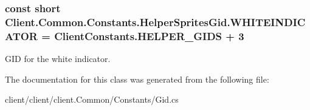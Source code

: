 \subsubsection[{W\+H\+I\+T\+E\+I\+N\+D\+I\+C\+A\+T\+O\+R}]{\setlength{\rightskip}{0pt plus 5cm}const short Client.\+Common.\+Constants.\+Helper\+Sprites\+Gid.\+W\+H\+I\+T\+E\+I\+N\+D\+I\+C\+A\+T\+O\+R = {\bf Client\+Constants.\+H\+E\+L\+P\+E\+R\+\_\+\+G\+I\+D\+S} + 3}\label{classClient_1_1Common_1_1Constants_1_1HelperSpritesGid_a38d81594f0e9a6780a3e63096003d9f1}


G\+I\+D for the white indicator. 



The documentation for this class was generated from the following file\+:\begin{DoxyCompactItemize}
\item 
client/client/client.\+Common/\+Constants/Gid.\+cs\end{DoxyCompactItemize}
